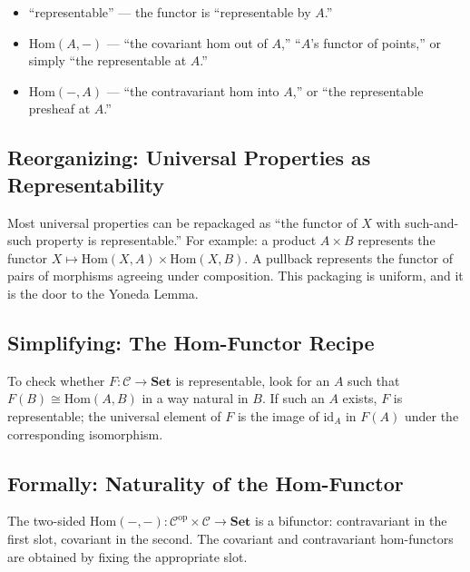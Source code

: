 \begin{howtosay}
\begin{itemize}
  \item ``representable'' --- the functor is ``representable by $A$.''
  \item $\mathrm{Hom}(A, -)$ --- ``the covariant hom out of $A$,''
        ``$A$'s functor of points,'' or simply ``the representable at $A$.''
  \item $\mathrm{Hom}(-, A)$ --- ``the contravariant hom into $A$,'' or
        ``the representable presheaf at $A$.''
\end{itemize}
\end{howtosay}

\subsection{Reorganizing: Universal Properties as Representability}

Most universal properties can be repackaged as ``the functor of $X$ with
such-and-such property is representable.'' For example: a product
$A \times B$ represents the functor $X \mapsto \mathrm{Hom}(X, A) \times
\mathrm{Hom}(X, B)$. A pullback represents the functor of pairs of
morphisms agreeing under composition. This packaging is uniform, and it
is the door to the Yoneda Lemma.

\subsection{Simplifying: The Hom-Functor Recipe}

To check whether $F : \mathcal{C} \to \mathbf{Set}$ is representable, look
for an $A$ such that $F(B) \cong \mathrm{Hom}(A, B)$ in a way natural in $B$.
If such an $A$ exists, $F$ is representable; the universal element of $F$
is the image of $\mathrm{id}_A$ in $F(A)$ under the corresponding isomorphism.

\subsection{Formally: Naturality of the Hom-Functor}

The two-sided $\mathrm{Hom}(-, -) : \mathcal{C}^{\mathrm{op}} \times
\mathcal{C} \to \mathbf{Set}$ is a bifunctor: contravariant in the first
slot, covariant in the second. The covariant and contravariant
hom-functors are obtained by fixing the appropriate slot.


